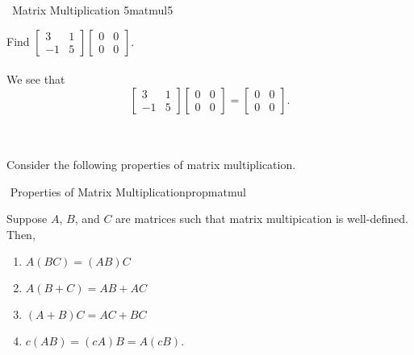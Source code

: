         \begin{example}{\Difficulty\,\Difficulty\,\,Matrix Multiplication 5}{matmul5}
        
            Find \(\begin{bmatrix} 3 & 1 \\ -1 & 5 \end{bmatrix}\begin{bmatrix} 0 & 0 \\ 0 & 0 \end{bmatrix}\).
            \\
            \\
            We see that
            \begin{equation*}
               \begin{bmatrix} 3 & 1 \\ -1 & 5 \end{bmatrix}\begin{bmatrix} 0 & 0 \\ 0 & 0 \end{bmatrix}=\begin{bmatrix} 0 & 0 \\ 0 & 0 \end{bmatrix}.
            \end{equation*}
                
        \end{example}
        \vphantom
        \\
        \\
        Consider the following properties of matrix multiplication.
        \begin{theorem}{\Stop\,\,Properties of Matrix Multiplication}{propmatmul}
        
            Suppose \(A\), \(B\), and \(C\) are matrices such that matrix multipication is well-defined. Then,
            \begin{enumerate}
                \item \(A(BC)=(AB)C\)
                \item \(A(B+C)=AB+AC\)
                \item \((A+B)C=AC+BC\) 
                \item \(c(AB)=(cA)B=A(cB)\).
            \end{enumerate}
        
        \end{theorem}
        \pagebreak
        \vphantom
        \\
        \\
